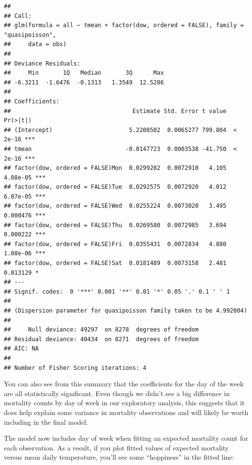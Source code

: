 \documentclass[
]{book}
\newenvironment{Shaded}{\begin{snugshade}}{\end{snugshade}}
\newcommand{\DataTypeTok}[1]{\textcolor[rgb]{0.13,0.29,0.53}{#1}}
\newcommand{\FloatTok}[1]{\textcolor[rgb]{0.00,0.00,0.81}{#1}}
\newcommand{\KeywordTok}[1]{\textcolor[rgb]{0.13,0.29,0.53}{\textbf{#1}}}
\newcommand{\NormalTok}[1]{#1}
\newcommand{\OperatorTok}[1]{\textcolor[rgb]{0.81,0.36,0.00}{\textbf{#1}}}
\newcommand{\StringTok}[1]{\textcolor[rgb]{0.31,0.60,0.02}{#1}}
\begin{document}
\begin{verbatim}
## 
## Call:
## glm(formula = all ~ tmean + factor(dow, ordered = FALSE), family = "quasipoisson", 
##     data = obs)
## 
## Deviance Residuals: 
##     Min       1Q   Median       3Q      Max  
## -6.3211  -1.6476  -0.1313   1.3549  12.5286  
## 
## Coefficients:
##                                   Estimate Std. Error t value Pr(>|t|)    
## (Intercept)                      5.2208502  0.0065277 799.804  < 2e-16 ***
## tmean                           -0.0147723  0.0003538 -41.750  < 2e-16 ***
## factor(dow, ordered = FALSE)Mon  0.0299282  0.0072910   4.105 4.08e-05 ***
## factor(dow, ordered = FALSE)Tue  0.0292575  0.0072920   4.012 6.07e-05 ***
## factor(dow, ordered = FALSE)Wed  0.0255224  0.0073020   3.495 0.000476 ***
## factor(dow, ordered = FALSE)Thu  0.0269580  0.0072985   3.694 0.000222 ***
## factor(dow, ordered = FALSE)Fri  0.0355431  0.0072834   4.880 1.08e-06 ***
## factor(dow, ordered = FALSE)Sat  0.0181489  0.0073158   2.481 0.013129 *  
## ---
## Signif. codes:  0 '***' 0.001 '**' 0.01 '*' 0.05 '.' 0.1 ' ' 1
## 
## (Dispersion parameter for quasipoisson family taken to be 4.992004)
## 
##     Null deviance: 49297  on 8278  degrees of freedom
## Residual deviance: 40434  on 8271  degrees of freedom
## AIC: NA
## 
## Number of Fisher Scoring iterations: 4
\end{verbatim}

You can also see from this summary that the coefficients for the day of the
week are all statistically significant. Even though we didn't see a big
difference in mortality counts by day of week in our exploratory analysis,
this suggests that it does help explain some variance in mortality observations
and will likely be worth including in the final model.

The model now includes day of week when fitting an expected mortality count
for each observation. As a result, if you plot fitted values of expected
mortality versus mean daily temperature, you'll see some ``hoppiness'' in the
fitted line:

\begin{Shaded}
\end{Shaded}
\end{document}
